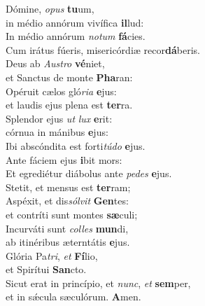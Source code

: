 \evenverse Dómine, \textit{o}\textit{pus} \textbf{tu}um,~\*\\
\evenverse in médio annórum vivífica \textbf{il}lud:\\
\oddverse In médio annórum \textit{no}\textit{tum} \textbf{fá}cies.~\*\\
\oddverse Cum irátus fúeris, misericórdiæ recor\textbf{dá}beris.\\
\evenverse Deus ab \textit{Au}\textit{stro} \textbf{vé}niet,~\*\\
\evenverse et Sanctus de monte \textbf{Pha}ran:\\
\oddverse Opéruit cælos gló\textit{ri}\textit{a} \textbf{e}jus:~\*\\
\oddverse et laudis ejus plena est \textbf{ter}ra.\\
\evenverse Splendor ejus \textit{ut} \textit{lux} \textbf{e}rit:~\*\\
\evenverse córnua in mánibus \textbf{e}jus:\\
\oddverse Ibi abscóndita est forti\textit{tú}\textit{do} \textbf{e}jus.~\*\\
\oddverse Ante fáciem ejus \textbf{i}bit mors:\\
\evenverse Et egrediétur diábolus ante \textit{pe}\textit{des} \textbf{e}jus.~\*\\
\evenverse Stetit, et mensus est \textbf{ter}ram;\\
\oddverse Aspéxit, et dis\textit{sól}\textit{vit} \textbf{Gen}tes:~\*\\
\oddverse et contríti sunt montes \textbf{sæ}culi;\\
\evenverse Incurváti sunt \textit{col}\textit{les} \textbf{mun}di,~\*\\
\evenverse ab itinéribus æterntátis \textbf{e}jus.\\
\oddverse Glória Pa\textit{tri}, \textit{et} \textbf{Fí}lio,~\*\\
\oddverse et Spirítui \textbf{San}cto.\\
\evenverse Sicut erat in princípio, et \textit{nunc}, \textit{et} \textbf{sem}per,~\*\\
\evenverse et in sǽcula sæculórum. \textbf{A}men.\\
